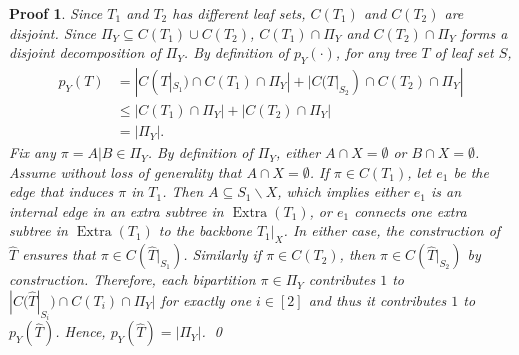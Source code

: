 \documentclass{bmcart}
\DeclareMathOperator*{\extra}{Extra}
\theoremstyle{mystyle}
\theoremstyle{proofstyle}
\newtheorem*{proof2}{Proof}
\newenvironment{proofnospace}{\begin{proof2}}{\qed \end{proof2}}
\begin{document}
\lemMaxPY*
\begin{proofnospace}
    Since $T_1$ and $T_2$ has different leaf sets, $C(T_1)$ and $C(T_2)$ are disjoint. Since $\Pi_Y \subseteq C(T_1)\cup C(T_2)$, $C(T_1) \cap \Pi_Y$ and $C(T_2)\cap \Pi_Y$ forms a disjoint decomposition of $\Pi_Y$. By definition of $p_Y(\cdot)$, for any tree $T$ of leaf set $S$,
    \begin{align*}
        p_Y(T) &= |C(T|_{S_1}) \cap C(T_1) \cap \Pi_Y| + |C(T|_{S_2}) \cap C(T_2) \cap \Pi_Y| \\
        &\le |C(T_1) \cap \Pi_Y| + | C(T_2) \cap \Pi_Y| \\
        &= |\Pi_Y|.
    \end{align*}
    Fix any $\pi = A|B \in \Pi_Y$. By definition of $\Pi_Y$, either $A \cap X = \emptyset$ or $B \cap X = \emptyset$. Assume without loss of generality that $A \cap X = \emptyset$. If $\pi \in C(T_1)$, let $e_1$ be the edge that induces $\pi$ in $T_1$. Then $A \subseteq S_1 \backslash X$, which implies either $e_1$ is an internal edge in an extra subtree in $\extra(T_1)$, or $e_1$ connects one extra subtree in $\extra(T_1)$ to the backbone $T_1|_X$. In either case, the construction of $\hat{T}$ ensures that $\pi \in C(\hat{T}|_{S_1})$. Similarly if $\pi \in C(T_2)$, then $\pi \in C(\hat{T}|_{S_2})$ by construction. Therefore, each bipartition $\pi \in \Pi_Y$ contributes $1$ to $|C(\hat{T}|_{S_i}) \cap C(T_i) \cap \Pi_Y|$ for exactly one $i \in [2]$ and thus it contributes $1$ to $p_Y(\hat{T})$. Hence, $p_Y(\hat{T}) = |\Pi_Y|$.
\end{proofnospace}
\end{document}

